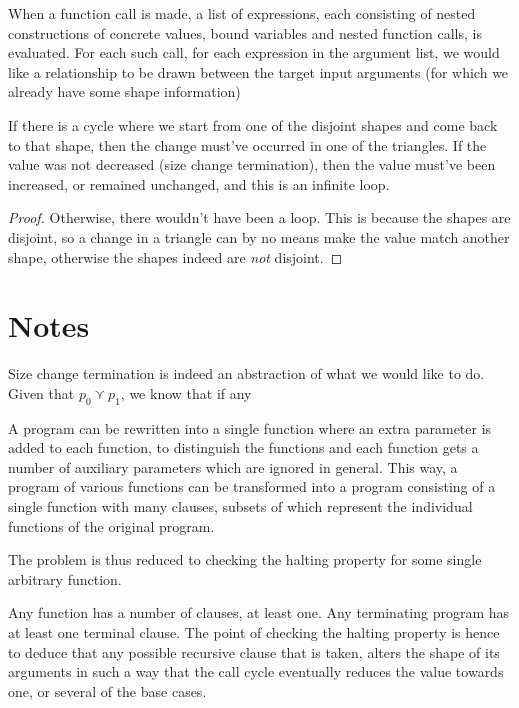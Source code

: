 When a function call is made, a list of expressions, each consisting of nested
constructions of concrete values, bound variables and nested function calls, is
evaluated. For each such call, for each expression in the argument list, we
would like a relationship to be drawn between the target input arguments (for
which we already have some shape information) 





If there is a cycle where we start from one of the disjoint shapes and come
back to that shape, then the change must've occurred in one of the triangles.
If the value was not decreased (size change termination), then the value
must've been increased, or remained unchanged, and this is an infinite loop.


\begin{proof} Otherwise, there wouldn't have been a loop. This is because the
shapes are disjoint, so a change in a triangle can by no means make the value
match another shape, otherwise the shapes indeed are \emph{not} disjoint.
\end{proof}





\newpage

\section{Notes}

Size change termination is indeed an abstraction of what we would like to do.
Given that $p_0\curlyvee p_1$, we know that if any 


A program can be rewritten into a single function where an extra parameter is
added to each function, to distinguish the functions and each function gets a
number of auxiliary parameters which are ignored in general. This way, a
program of various functions can be transformed into a program consisting of a
single function with many clauses, subsets of which represent the individual
functions of the original program.

The problem is thus reduced to checking the halting property for some single
arbitrary function.

Any function has a number of clauses, at least one. Any terminating program has
at least one terminal clause. The point of checking the halting property is
hence to deduce that any possible recursive clause that is taken, alters the
shape of its arguments in such a way that the call cycle eventually reduces the
value towards one, or several of the base cases.

